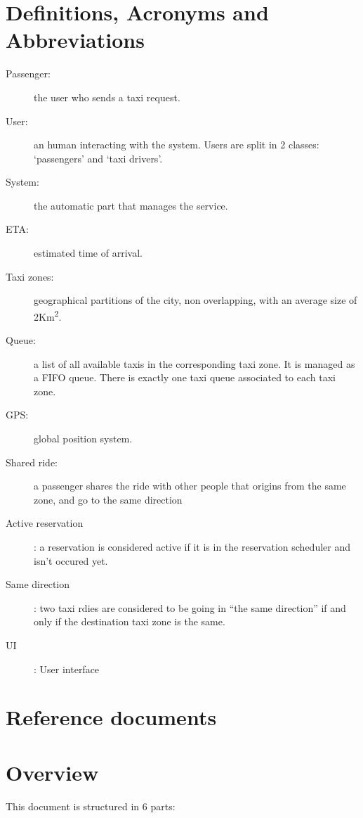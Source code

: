 \section{Definitions, Acronyms and Abbreviations}
\begin{description}
  \item[Passenger:] the user who sends a taxi request.
  \item[User:] an human interacting with the system. Users are split in 2 classes: `passengers' and `taxi drivers'.
  \item[System:] the automatic part that manages the service.
  \item[ETA:] estimated time of arrival.
  \item[Taxi zones:] geographical partitions of the city, non overlapping, with an average size of 2Km\textsuperscript{2}.
  \item[Queue:] a list of all available taxis in the corresponding taxi zone. It is managed as a FIFO queue.
    There is exactly one taxi queue associated to each taxi zone.
  \item[GPS:] global position system.
  \item[Shared ride:] a passenger shares the ride with other people that origins from the same zone, and go to the same direction
  \item[Active reservation]: a reservation is considered active if it is in the reservation scheduler and isn't occured yet.
  \item[Same direction]: two taxi rdies are considered to be going in ``the same direction'' if and only if the destination taxi zone is the same.
\item [UI]: User interface
\end{description}


\section{Reference documents}


\section{Overview}

This document is structured in 6 parts:

